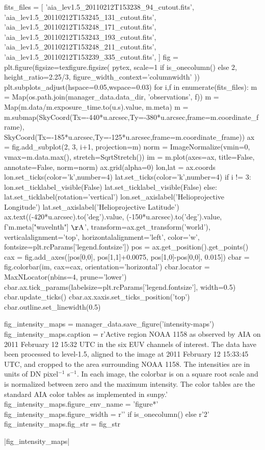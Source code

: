 \begin{pycode}
fits_files = [
    'aia_lev1.5_20110212T153238_94_cutout.fits',
    'aia_lev1.5_20110212T153245_131_cutout.fits',
    'aia_lev1.5_20110212T153248_171_cutout.fits',
    'aia_lev1.5_20110212T153243_193_cutout.fits',
    'aia_lev1.5_20110212T153248_211_cutout.fits',
    'aia_lev1.5_20110212T153239_335_cutout.fits',
]
fig = plt.figure(figsize=texfigure.figsize(
    pytex,
    scale=1 if is_onecolumn() else 2,
    height_ratio=2.25/3,
    figure_width_context='columnwidth'
))
plt.subplots_adjust(hspace=0.05,wspace=0.03)
for i,f in enumerate(fits_files):
    m = Map(os.path.join(manager_data.data_dir, 'observations', f))
    m = Map(m.data/m.exposure_time.to(u.s).value, m.meta)
    m = m.submap(SkyCoord(Tx=-440*u.arcsec,Ty=-380*u.arcsec,frame=m.coordinate_frame),
                 SkyCoord(Tx=-185*u.arcsec,Ty=-125*u.arcsec,frame=m.coordinate_frame))
    ax = fig.add_subplot(2, 3, i+1, projection=m)
    norm = ImageNormalize(vmin=0, vmax=m.data.max(), stretch=SqrtStretch())
    im = m.plot(axes=ax, title=False, annotate=False, norm=norm)
    ax.grid(alpha=0)
    lon,lat = ax.coords
    lon.set_ticks(color='k',number=4)
    lat.set_ticks(color='k',number=4)
    if i != 3:
        lon.set_ticklabel_visible(False)
        lat.set_ticklabel_visible(False)
    else:
        lat.set_ticklabel(rotation='vertical')
        lon.set_axislabel('Helioprojective Longitude')
        lat.set_axislabel('Helioprojective Latitude')
    ax.text((-420*u.arcsec).to('deg').value,
            (-150*u.arcsec).to('deg').value,
            f'{m.meta["wavelnth"]} $\mathrm{{\AA}}$',
            transform=ax.get_transform('world'),
            verticalalignment='top',
            horizontalalignment='left',
            color='w',
            fontsize=plt.rcParams['legend.fontsize'])
    pos = ax.get_position().get_points()
    cax = fig.add_axes([pos[0,0], pos[1,1]+0.0075, pos[1,0]-pos[0,0], 0.015])
    cbar = fig.colorbar(im, cax=cax, orientation='horizontal')
    cbar.locator = MaxNLocator(nbins=4, prune='lower')
    cbar.ax.tick_params(labelsize=plt.rcParams['legend.fontsize'], width=0.5)
    cbar.update_ticks()
    cbar.ax.xaxis.set_ticks_position('top')
    cbar.outline.set_linewidth(0.5)

fig_intensity_maps = manager_data.save_figure('intensity-maps')
fig_intensity_maps.caption = r'Active region NOAA 1158 as observed by AIA on 2011 February 12 15:32 UTC in the six EUV channels of interest. The data have been processed to level-1.5, aligned to the image at 2011 February 12 15:33:45 UTC, and cropped to the area surrounding NOAA 1158. The intensities are in units of DN pixel$^{-1}$ s$^{-1}$. In each image, the colorbar is on a square root scale and is normalized between zero and the maximum intensity. The color tables are the standard AIA color tables as implemented in sunpy.'
fig_intensity_maps.figure_env_name = 'figure*'
fig_intensity_maps.figure_width = r'\columnwidth' if is_onecolumn() else r'2\columnwidth'
fig_intensity_maps.fig_str = fig_str
\end{pycode}
|fig_intensity_maps|


